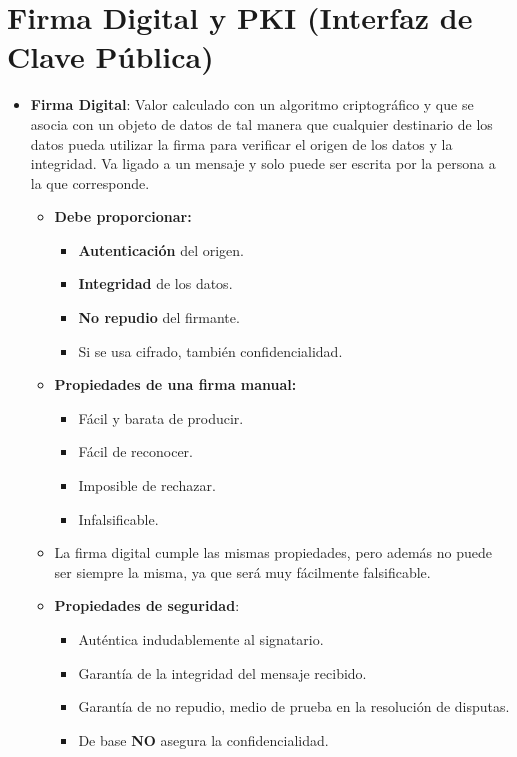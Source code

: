 \documentclass[12pt, twoside, openright]{report} %
\begin{document}
\section{Firma Digital y PKI (Interfaz de Clave Pública)}
\begin{itemize}
	\item \textbf{Firma Digital}: Valor calculado con un algoritmo criptográfico y que se asocia con un objeto de datos de tal manera que cualquier destinario de los datos pueda utilizar la firma para verificar el origen de los datos y la integridad. Va ligado a un mensaje y solo puede ser escrita por la persona a la que corresponde.
	      \begin{itemize}
		      \item \textbf{Debe proporcionar:}
		            \begin{itemize}
			            \item \textbf{Autenticación} del origen.
			            \item \textbf{Integridad} de los datos.
			            \item \textbf{No repudio} del firmante.
			            \item Si se usa cifrado, también confidencialidad.
		            \end{itemize}
		      \item \textbf{Propiedades de una firma manual:}
		            \begin{itemize}
			            \item Fácil y barata de producir.
			            \item Fácil de reconocer.
			            \item Imposible de rechazar.
			            \item Infalsificable.
		            \end{itemize}
		      \item La firma digital cumple las mismas propiedades, pero además no puede ser siempre la misma, ya que será muy fácilmente falsificable.
		      \item \textbf{Propiedades de seguridad}:
		            \begin{itemize}
			            \item Auténtica indudablemente al signatario.
			            \item Garantía de la integridad del mensaje recibido.
			            \item Garantía de no repudio, medio de prueba en la resolución de disputas.
			            \item De base \textbf{NO} asegura la confidencialidad.

\end{itemize}
\end{itemize}
\end{itemize}
\end{document}
